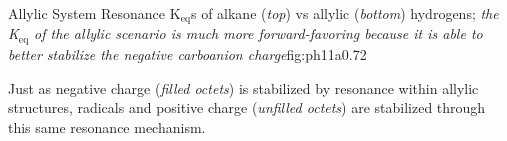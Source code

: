 \begin{core}{Allylic System Resonance}
{{{          }
          \qquad \qquad
          \arrow{<<->[][$\text{K}_\text{eq} = 10^{(35-40)}$]}
          \qquad
          \arrow{<->}
        }
      }{K$_\text{eq}$s of alkane (\textit{top}) vs allylic (\textit{bottom}) hydrogens; \textit{the K$_\text{eq}$ of the allylic scenario is much more forward-favoring because it is able to better stabilize the negative carboanion charge}}{fig:ph11a}{0.72}
      \vspace{-0.5cm}

      Just as negative charge (\textit{filled octets}) is stabilized by resonance within allylic structures, radicals and positive charge (\textit{unfilled octets}) are stabilized through this same resonance mechanism.


\end{core}
